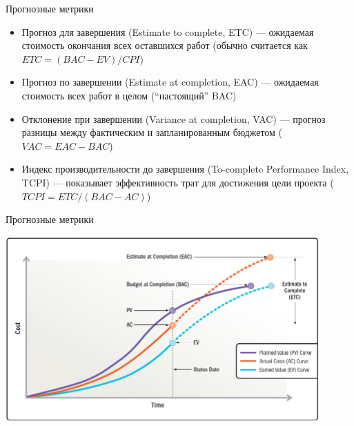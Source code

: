 \documentclass{../../slides-style}
\begin{document}
    \begin{frame}{Прогнозные метрики}
        \begin{itemize}
            \item Прогноз для завершения (Estimate to complete, ETC) --- ожидаемая стоимость окончания всех оставшихся работ (обычно считается как $ETC = (BAC - EV) / CPI$)
            \item Прогноз по завершении (Estimate at completion, EAC) --- ожидаемая стоимость всех работ в целом (\enquote{настоящий} BAC)
            \item Отклонение при завершении (Variance at completion, VAC) --- прогноз разницы между фактическим и запланированным бюджетом ($VAC = EAC - BAC$)
            \item Индекс производительности до завершения (To-complete Performance Index, TCPI) --- показывает эффективность трат для достижения цели проекта ($TCPI =  ETC / (BAC - AC)$)
        \end{itemize}
    \end{frame}

    \begin{frame}{Прогнозные метрики}
        \begin{center}
            \includegraphics[width=0.9\textwidth]{eacEtcMetricsGraph.png}
        \end{center}
    \end{frame}
\end{document}
